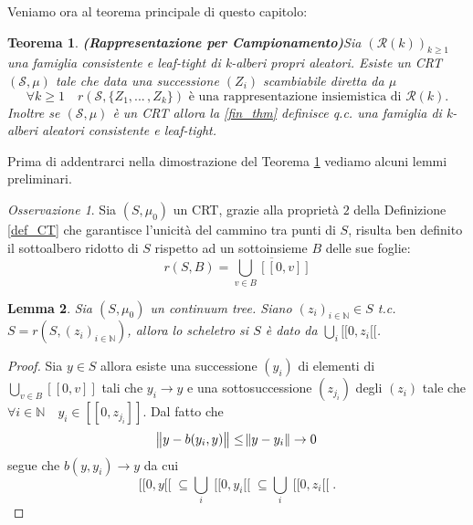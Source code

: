 \documentclass[11pt, twoside]{report}
\newcommand{\Ss}{\mathscr{S}}
\newcommand{\Rr}{\mathscr{R}}
\theoremstyle{definition}
\theoremstyle{plain}
\newtheorem{teo}{Teorema}[chapter]
\newtheorem{lemma}[teo]{Lemma}
\theoremstyle{remark}
\newtheorem{oss}{Osservazione}[chapter]
\numberwithin{equation}{chapter}
\begin{document}
Veniamo ora al teorema principale di questo capitolo:
\begin{teo}{\textbf{(Rappresentazione per Campionamento)}}\label{rap_fin}
Sia $(\Rr(k))_{k\geq 1}$ una famiglia consistente e leaf-tight di k-alberi propri aleatori. Esiste un CRT $(\Ss, \mu)$ tale che data una successione $(Z_i)$ scambiabile diretta da $\mu$
\begin{equation}\label{fin_thm}
\forall k\geq 1 \quad r(\Ss, \{Z_1, ... \, , Z_k\}) \text{ è una rappresentazione insiemistica di } \Rr(k).
\end{equation}
Inoltre se $(\Ss, \mu)$ è un CRT allora la \eqref{fin_thm} definisce q.c. una famiglia di k-alberi aleatori consistente e leaf-tight.
\end{teo}

Prima di addentrarci nella dimostrazione del Teorema \ref{rap_fin} vediamo alcuni lemmi preliminari.
\begin{oss}
Sia $(S,\mu_0)$ un CRT, grazie alla proprietà $2$ della Definizione \ref{def_CT} che garantisce l'unicità del cammino tra punti di $S$, risulta ben definito il sottoalbero ridotto di $S$ rispetto ad un sottoinsieme $B$ delle sue foglie:
$$r(S,B)=\overline{\bigcup\limits_{v\in B} [[0,v]]}$$
\end{oss}
\begin{lemma}\label{scheletro_lemma}
Sia $(S, \mu_0)$ un continuum tree. Siano $(z_i)_{i\in \mathbb{N}} \in S$ t.c. $S=r(S, (z_i)_{i\in \mathbb{N}})$, allora lo scheletro si $S$ è dato da $\bigcup_i [[0,z_i[[$.
\end{lemma}
\begin{proof}
Sia $y \in S$ allora esiste una successione $(y_i)$ di elementi di $\bigcup\limits_{v\in B} [[0,v]]$ tali che $y_i \rightarrow y$ e una sottosuccessione $(z_{j_i})$ degli $(z_i)$ tale che $\forall i\in \mathbb{N} \quad y_i \in [[0,z_{j_i}]]$. Dal fatto che 
$$\norm{y-b(y_i,y)}\leq \norm{y-y_i} \rightarrow 0$$
segue che $b(y,y_i) \rightarrow y$ da cui
$$[[0,y[[ \; \subseteq \bigcup\limits_i \; [[0,y_i[[ \;\subseteq \bigcup\limits_i \; [[0,z_i[[\; .$$
\end{proof}
\end{document}

